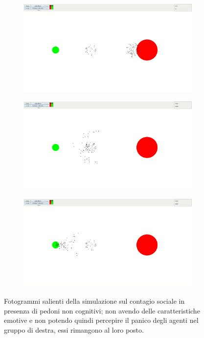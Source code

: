 \begin{figure}
    \centering
    \begin{subfigure}[b]{0.75\textwidth}
        \centering
        \includegraphics[width=\textwidth]{immagini/casi-studio/social-contagion-not-cognitive-begin.png}
    \end{subfigure}
    \hfill
    \begin{subfigure}[b]{0.75\textwidth}
        \centering
        \includegraphics[width=\textwidth]{immagini/casi-studio/social-contagion-not-cognitive-during.png}
    \end{subfigure}
    \hfill
    \begin{subfigure}[b]{0.75\textwidth}
        \centering
        \includegraphics[width=\textwidth]{immagini/casi-studio/social-contagion-not-cognitive-end.png}
    \end{subfigure}
    \caption{Fotogrammi salienti della simulazione sul contagio sociale in presenza di pedoni non cognitivi; non avendo delle caratteristiche emotive e non potendo quindi percepire il panico degli agenti nel gruppo di destra, essi rimangono al loro posto.}
    \label{fig:social-contagion-not-cognitive}
\end{figure}

